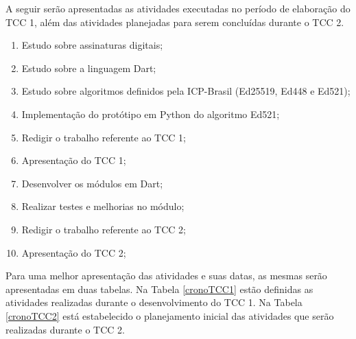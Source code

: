 A seguir serão apresentadas as atividades executadas no período de elaboração do TCC 1, além das atividades planejadas para serem concluídas durante o TCC 2.

\begin{enumerate}
    \item Estudo sobre assinaturas digitais;
    \item Estudo sobre a linguagem Dart;
    \item Estudo sobre algoritmos definidos pela ICP-Brasil (Ed25519, Ed448 e Ed521);
    \item Implementação do protótipo em Python do algoritmo Ed521;
    \item Redigir o trabalho referente ao TCC 1;
    \item Apresentação do TCC 1;
    \item Desenvolver os módulos em Dart;
    \item Realizar testes e melhorias no módulo;
    \item Redigir o trabalho referente ao TCC 2;
    \item Apresentação do TCC 2;
\end{enumerate}

Para uma melhor apresentação das atividades e suas datas, as mesmas serão apresentadas em duas tabelas. Na Tabela \ref{cronoTCC1} estão definidas as atividades realizadas durante o desenvolvimento do TCC 1. Na Tabela \ref{cronoTCC2} está estabelecido o planejamento inicial das atividades que serão realizadas durante o TCC 2.

\begin{table}[H]
\caption{Cronograma referente ao TCC 1}
\label{cronoTCC1}
\end{table}

